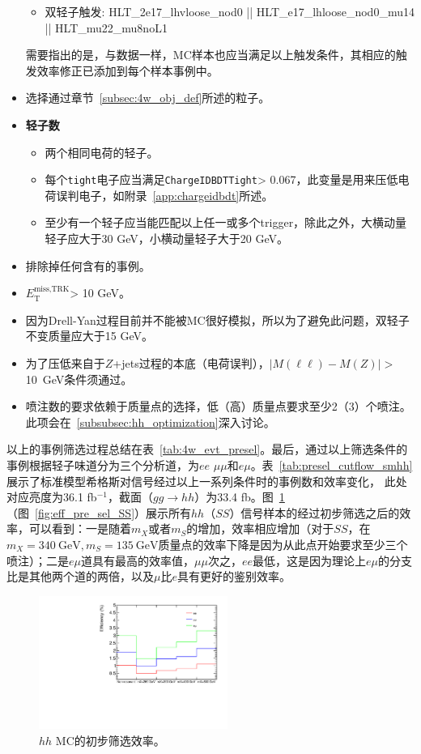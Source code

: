 \begin{itemize}
\begin{itemize}
    \item 双轻子触发: HLT\_2e17\_lhvloose\_nod0 || HLT\_e17\_lhloose\_nod0\_mu14 || HLT\_mu22\_mu8noL1 
  \end{itemize}
 需要指出的是，与数据一样，MC样本也应当满足以上触发条件，其相应的触发效率修正已添加到每个样本事例中。
  \item 选择通过章节~\ref{subsec:4w_obj_def}所述的粒子。
  \item \textbf{轻子数}
	\begin{itemize}
	      \item 两个相同电荷的轻子。
	      \item 每个\texttt{tight}电子应当满足\texttt{ChargeIDBDTTight}> 0.067，此变量是用来压低电荷误判电子，如附录~\ref{app:chargeidbdt}所述。
	      \item 至少有一个轻子应当能匹配以上任一或多个trigger，除此之外，大横动量轻子\pt 应大于30 GeV，小横动量轻子大于20 GeV。
	\end{itemize}
  \item 排除掉任何含有\bjet 的事例。
  \item $E_{\text{T}}^{\text{miss,TRK}}$> 10 GeV。
  \item 因为Drell-Yan过程目前并不能被MC很好模拟，所以为了避免此问题，双轻子不变质量应大于15 GeV。
  \item 为了压低来自于$Z$+jets过程的本底（电荷误判），$|M(\ell\ell)-M(Z)|>$10~GeV条件须通过。
  \item 喷注数的要求依赖于质量点的选择，低（高）质量点要求至少2（3）个喷注。此项会在~\ref{subsubsec:hh_optimization}深入讨论。
\end{itemize}
以上的事例筛选过程总结在表~\ref{tab:4w_evt_presel}。最后，通过以上筛选条件的事例根据轻子味道分为三个分析道，为$ee$
$\mu\mu$和$e\mu$。表~\ref{tab:presel_cutflow_smhh}展示了标准模型希格斯对信号经过以上一系列条件时的事例数和效率变化，
此处对应亮度为36.1 fb$^{-1}$，截面（$gg\rightarrow hh$）为33.4 fb。图~\ref{fig:eff_pre_sel_hh}（图~\ref{fig:eff_pre_sel_SS}）展示所有$hh$（$SS$）信号样本的经过初步筛选之后的效率，可以看到：一是随着$m_X$或者$m_S$的增加，效率相应增加（对于$SS$，在$m_X=340~\text{GeV}, m_S=135~\text{GeV}$质量点的效率下降是因为从此点开始要求至少三个喷注）；二是$e\mu$道具有最高的效率值，$\mu\mu$次之，$ee$最低，这是因为理论上$e\mu$的分支比是其他两个道的两倍，以及$\mu$比$e$具有更好的鉴别效率。



\begin{figure}
\centering
\includegraphics[width=0.55\textwidth, angle =-90]{fig/SigTopo/eff_presel_hh.pdf}
\caption{$hh$ MC的初步筛选效率。}
\label{fig:eff_pre_sel_hh}
\end{figure}

